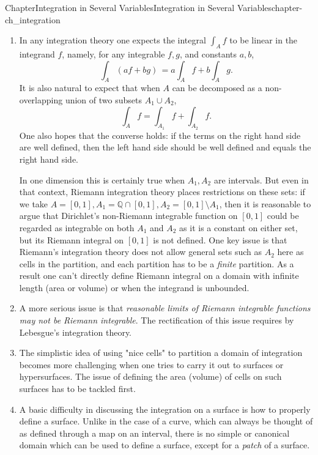 \documentclass[oneside,10pt,]{book}
\numberwithin{equation}{section}
\begin{document}
\begin{chapterptx}{Chapter}{Integration in Several Variables}{}{Integration in Several Variables}{}{}{chapter-ch_integration}
\begin{introduction}{}
\begin{enumerate}
\item{}In any integration theory one expects the integral \(\int_{A}f\) to be linear in the integrand \(f\), namely, for any integrable \(f, g\), and constants \(a, b\),%
\begin{equation*}
\int_{A} \left( a f+ b g\right)\, = a \int_{A}f  + b \int_{A}g.
\end{equation*}
It is also natural to expect that when \(A\) can be decomposed as a non-overlapping union of two subsets \(A_{1}\cup A_{2}\),%
\begin{equation*}
\int_{A}f =\int_{A_{1}}f + \int_{A_{2}}f\text{.}
\end{equation*}
One also hopes that the converse holds: if the terms on the right hand side are well defined, then the left hand side should be well defined and equals the right hand side.%
\par
In one dimension this is certainly true when \(A_{1}, A_{2}\) are intervals. But even in that context, Riemann integration theory places restrictions on these sets: if we take \(A=[0,1], A_{1}={\mathbb Q}\cap [0, 1], A_{2}=[0,1]\setminus A_{1}\), then it is reasonable to argue that Dirichlet's non-Riemann integrable function on \([0,1]\) could be regarded as integrable on both \(A_{1}\) and \(A_{2}\) as it is a constant on either set, but its Riemann integral on \([0, 1]\) is not defined. One key issue is that Riemann's integration theory does not allow general sets such as \(A_{2}\) here as cells in the partition, and each partition has to be a \emph{finite} partition. As a result one can't directly define Riemann integral on a domain with infinite length (area or volume) or when the integrand is unbounded.%
\item{}A more serious issue is that \emph{reasonable limits of Riemann integrable functions may not be Riemann integrable}. The rectification of this issue requires by Lebesgue's integration theory.%
\item{}The simplistic idea of using "nice cells" to partition a domain of integration becomes more challenging when one tries to carry it out to surfaces or hypersurfaces. The issue of defining the area (volume) of cells on such surfaces has to be tackled first.%
\item{}A basic difficulty in discussing the integration on a surface is how to properly define a surface. Unlike in the case of a curve, which can always be thought of as defined through a map on an interval, there is no simple or canonical domain  which can be used to define a surface, except for a \emph{patch} of a surface.%

\end{enumerate}
\end{introduction}
\end{chapterptx}
\end{document}
